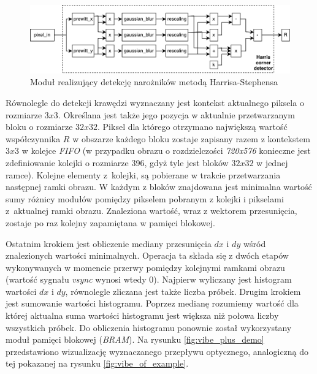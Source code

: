 	\begin{figure}[h!]
		\centering
		\includegraphics[scale=0.6]{img/4/harris_detector.pdf}
		\caption{Moduł realizujący detekcję narożników metodą Harrisa-Stephensa}
		\label{fig:harris_diagram}
	\end{figure}

Równolegle do detekcji krawędzi wyznaczany jest kontekst aktualnego piksela o rozmiarze $3x3$. 
Określana jest także jego pozycja w aktualnie przetwarzanym bloku o rozmiarze $32x32$. 
Piksel dla którego otrzymano największą wartość współczynnika $R$ w obszarze każdego bloku zostaje zapisany razem z kontekstem $3x3$ w kolejce \textit{FIFO} (w przypadku obrazu o rozdzielczości \textit{720x576} konieczne jest zdefiniowanie kolejki o rozmiarze 396, gdyż tyle jest bloków $32x32$ w jednej ramce). %
Kolejne elementy z~kolejki, są pobierane w trakcie przetwarzania następnej ramki obrazu. 
W każdym z bloków znajdowana jest minimalna wartość sumy różnicy modułów pomiędzy pikselem pobranym z kolejki i pikselami z~aktualnej ramki obrazu.
Znaleziona wartość, wraz z wektorem przesunięcia, zostaje po raz kolejny zapamiętana w pamięci blokowej. 

Ostatnim krokiem jest obliczenie mediany przesunięcia $dx$ i $dy$ wśród znalezionych wartości minimalnych. 
Operacja ta składa się z dwóch etapów wykonywanych w momencie przerwy pomiędzy kolejnymi ramkami obrazu (wartość sygnału \textit{vsync} wynosi wtedy $0$). 
Najpierw wyliczany jest histogram wartości $dx$ i $dy$, równolegle zliczana jest także liczba próbek. 
Drugim krokiem jest sumowanie wartości histogramu. 
Poprzez medianę rozumiemy wartość dla której aktualna suma wartości histogramu jest większa niż połowa liczby wszystkich próbek. 
Do obliczenia histogramu ponownie został wykorzystany moduł pamięci blokowej (\textit{BRAM}). 
Na rysunku \ref{fig:vibe_plus_demo} przedstawiono wizualizację wyznaczanego przepływu optycznego, analogiczną do tej pokazanej na rysunku \ref{fig:vibe_of_example}.

